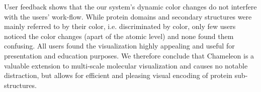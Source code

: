 \documentclass{egpubl}
\begin{document}
User feedback shows that the our system's dynamic color changes do not interfere with the users' work-flow. 
While protein domains and secondary structures were mainly referred to by their color, i.e. discriminated by color, only few users noticed the color changes (apart of the atomic level) and none found them confusing. 
All users found the visualization highly appealing and useful for presentation and education purposes. 
We therefore conclude that Chameleon is a valuable extension to multi-scale molecular visualization and causes no notable distraction, but allows for efficient and pleasing visual encoding of protein sub-structures. 

	
%	
%	
%	
%	
\end{document}
